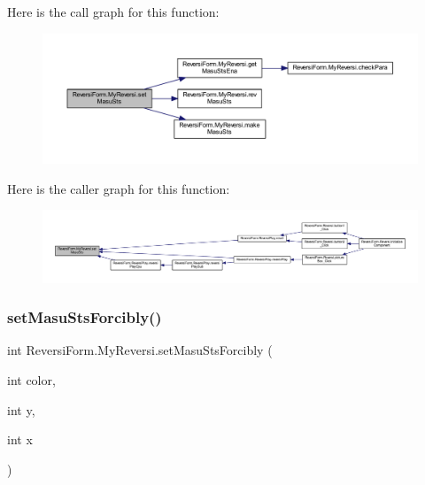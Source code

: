 Here is the call graph for this function\+:
\nopagebreak
\begin{figure}[H]
\begin{center}
\leavevmode
\includegraphics[width=350pt]{class_reversi_form_1_1_my_reversi_a1f7ba86f6e8d5dd2fa472a8994e4e3c5_cgraph}
\end{center}
\end{figure}
Here is the caller graph for this function\+:
\nopagebreak
\begin{figure}[H]
\begin{center}
\leavevmode
\includegraphics[width=350pt]{class_reversi_form_1_1_my_reversi_a1f7ba86f6e8d5dd2fa472a8994e4e3c5_icgraph}
\end{center}
\end{figure}
\mbox{\label{class_reversi_form_1_1_my_reversi_a940c5ec6841ffa050a53276815afcc9d}} 
\subsubsection{\texorpdfstring{set\+Masu\+Sts\+Forcibly()}{setMasuStsForcibly()}}
{\footnotesize\ttfamily int Reversi\+Form.\+My\+Reversi.\+set\+Masu\+Sts\+Forcibly (\begin{DoxyParamCaption}\item[{int}]{color,  }\item[{int}]{y,  }\item[{int}]{x }\end{DoxyParamCaption})}



